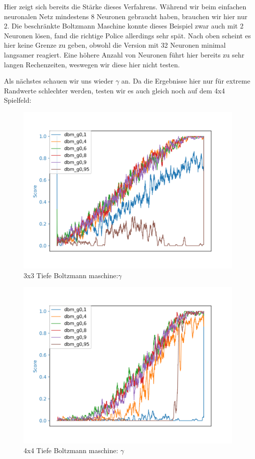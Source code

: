 Hier zeigt sich bereits die Stärke dieses Verfahrens. Während wir beim einfachen neuronalen Netz mindestens 8 Neuronen gebraucht haben, brauchen wir hier nur 2. Die beschränkte Boltzmann Maschine konnte dieses Beispiel zwar auch mit 2 Neuronen lösen, fand die richtige Police allerdings sehr spät. Nach oben scheint es hier keine Grenze zu geben, obwohl die Version mit 32 Neuronen minimal langsamer reagiert. Eine höhere Anzahl von Neuronen führt hier bereits zu sehr langen Rechenzeiten, weswegen wir diese hier nicht testen.

Als nächstes schauen wir uns wieder $\gamma$ an. Da die Ergebnisse hier nur für extreme Randwerte schlechter werden, testen wir es auch gleich noch auf dem 4x4 Spielfeld:

\begin{figure}[H]
\centering
\includegraphics[width=\textwidth]{Figures/dbm4_3x3_dbm_g0,1_dbm_g0,4_dbm_g0,6_dbm_g0,8_dbm_g0,9_dbm_g0,95.png}
\caption{3x3 Tiefe Boltzmann maschine:$\gamma$}
\label{dbm1}
\end{figure}

\begin{figure}[H]
\centering
\includegraphics[width=\textwidth]{Figures/dbm5_4x4_dbm_g0,1_dbm_g0,4_dbm_g0,6_dbm_g0,8_dbm_g0,9_dbm_g0,95.png}
\caption{4x4 Tiefe Boltzmann maschine: $\gamma$}
\label{dbm1}
\end{figure}

